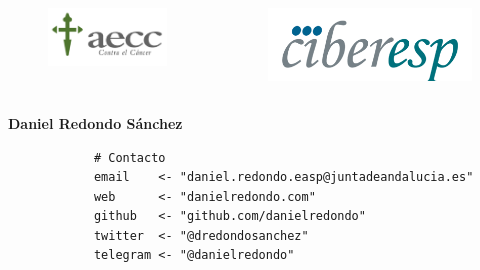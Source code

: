 \documentclass{beamer}
\begin{document}
\begin{frame}[fragile]
\begin{columns}
\begin{column}{0.33\textwidth}
		\begin{figure}
			\centering
			\includegraphics[width=.7\textwidth]{logos/logo_aecc.png}
		\end{figure}
	\end{column}
	\begin{column}{0.33\textwidth}
		\begin{figure}
			\centering
			\includegraphics[width=.7\textwidth]{logos/logo_ciber.png}
		\end{figure}
	\end{column}
\end{columns}

	\bigskip
	
	\vspace{20pt}
		
	\centering
	\Large
	\textbf{Daniel Redondo Sánchez}
	
	\bigskip


	\normalsize{
		\begin{verbatim}
			# Contacto
			email    <- "daniel.redondo.easp@juntadeandalucia.es"
			web      <- "danielredondo.com"
			github   <- "github.com/danielredondo"
			twitter  <- "@dredondosanchez"
			telegram <- "@danielredondo"
		\end{verbatim}
		
}
\end{frame}
\end{document}
